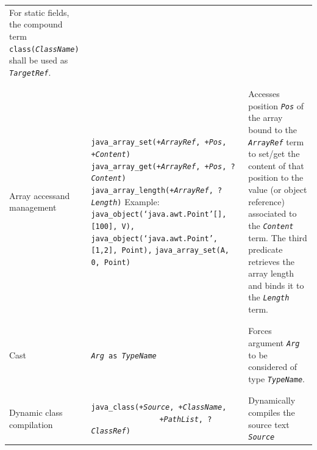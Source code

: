\begin{table}
\begin{center}
{\begin{tabular}{p{2.3cm}p{6.6cm}p{4.6cm}}
    For static fields, the compound term \texttt{class(\textit{ClassName})}
    shall be used as \texttt{\textit{TargetRef}}.
    \\\\\hline\\
    Array access\newline and management
    &
    \texttt{java\_array\_set(+\textit{ArrayRef}, +\textit{Pos}, +\textit{Content})}\newline
    \texttt{java\_array\_get(+\textit{ArrayRef}, +\textit{Pos}, ?\textit{Content})}\newline
    \texttt{java\_array\_length(+\textit{ArrayRef}, ?\textit{Length})}\newline
    \newline
    Example:\newline
    \texttt{java\_object(`java.awt.Point'[], [100], V),}\newline
    \texttt{java\_object(`java.awt.Point', [1,2], Point),}\newline
    \texttt{java\_array\_set(A, 0, Point)}
    &
    Accesses position \texttt{\textit{Pos}} of the array bound to the
    \texttt{\textit{ArrayRef}} term to set/get the content of that position
    to the value (or object reference) associated to the \texttt{\textit{Content}} term.
    \newline
    The third predicate retrieves the array length and binds it to the
    \textit{\texttt{Length}} term.
    \\\\\hline\\
    Cast
    &
    \texttt{\textit{Arg} as \textit{TypeName}}\newline
    &
    Forces argument \texttt{\textit{Arg}} to be considered of type
    \texttt{\textit{TypeName}}.
    \\\\\hline\\
    Dynamic class \newline compilation
    &
    \texttt{java\_class(+\textit{Source}, +\textit{ClassName},}\newline
    \mbox{~~~~~~~~~~~~~~~~}\texttt{+\textit{PathList}, ?\textit{ClassRef})}\newline
    &
    Dynamically compiles the source text \texttt{\textit{Source}}

\end{tabular}}
\end{center}
\end{table}
